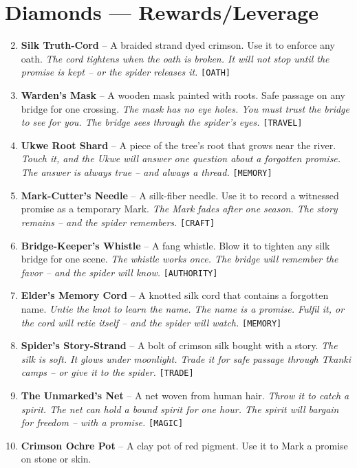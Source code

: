 \section*{Diamonds --- Rewards/Leverage}
\label{sec:lethaiar-rewards}
\begin{enumerate}
\setcounter{enumi}{1}
\item \textbf{Silk Truth-Cord} -- A braided strand dyed crimson. Use it to enforce any oath.
  \hfill \textit{The cord tightens when the oath is broken. It will not stop until the promise is kept -- or the spider releases it.} \texttt{[OATH]}
\item \textbf{Warden's Mask} -- A wooden mask painted with roots. Safe passage on any bridge for one crossing.
  \hfill \textit{The mask has no eye holes. You must trust the bridge to see for you. The bridge sees through the spider's eyes.} \texttt{[TRAVEL]}
\item \textbf{Ukwe Root Shard} -- A piece of the tree's root that grows near the river.
  \hfill \textit{Touch it, and the Ukwe will answer one question about a forgotten promise. The answer is always true -- and always a thread.} \texttt{[MEMORY]}
\item \textbf{Mark-Cutter's Needle} -- A silk-fiber needle. Use it to record a witnessed promise as a temporary Mark.
  \hfill \textit{The Mark fades after one season. The story remains -- and the spider remembers.} \texttt{[CRAFT]}
\item \textbf{Bridge-Keeper's Whistle} -- A fang whistle. Blow it to tighten any silk bridge for one scene.
  \hfill \textit{The whistle works once. The bridge will remember the favor -- and the spider will know.} \texttt{[AUTHORITY]}
\item \textbf{Elder's Memory Cord} -- A knotted silk cord that contains a forgotten name.
  \hfill \textit{Untie the knot to learn the name. The name is a promise. Fulfil it, or the cord will retie itself -- and the spider will watch.} \texttt{[MEMORY]}
\item \textbf{Spider's Story-Strand} -- A bolt of crimson silk bought with a story.
  \hfill \textit{The silk is soft. It glows under moonlight. Trade it for safe passage through Tkanki camps -- or give it to the spider.} \texttt{[TRADE]}
\item \textbf{The Unmarked's Net} -- A net woven from human hair.
  \hfill \textit{Throw it to catch a spirit. The net can hold a bound spirit for one hour. The spirit will bargain for freedom -- with a promise.} \texttt{[MAGIC]}
\item \textbf{Crimson Ochre Pot} -- A clay pot of red pigment. Use it to Mark a promise on stone or skin.

\end{enumerate}
